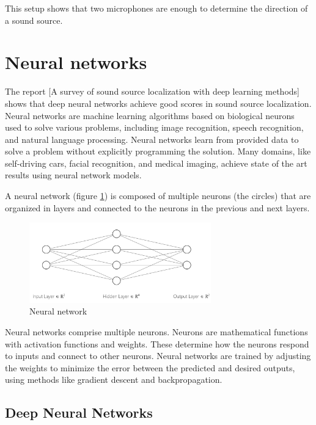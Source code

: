 This setup shows that two microphones are enough to determine the direction of a sound source.

\section{Neural networks}

The report [A survey of sound source localization with deep learning methods]\cite{Grumiaux_2022} shows that deep neural networks achieve good scores in sound source localization. Neural networks are machine learning algorithms based on biological neurons used to solve various problems, including image recognition, speech recognition, and natural language processing. Neural networks learn from provided data to solve a problem without explicitly programming the solution. Many domains, like self-driving cars, facial recognition, and medical imaging, achieve state of the art results using neural network models. 

A neural network (figure \ref*{fig:neural_network}) is composed of multiple neurons (the circles) that are organized in layers and connected to the neurons in the previous and next layers. 

\begin{figure}[H]
    \centering
    \includegraphics[width=0.7\textwidth]{../Images/neural_network_example.png}
    \caption{Neural network}
    \label{fig:neural_network}
\end{figure}

Neural networks comprise multiple neurons. Neurons are mathematical functions with activation functions and weights. These determine how the neurons respond to inputs and connect to other neurons. Neural networks are trained by adjusting the weights to minimize the error between the predicted and desired outputs, using methods like gradient descent\cite{zhang2019gradient} and backpropagation\cite{Sekhar}.

\subsection{Deep Neural Networks}

